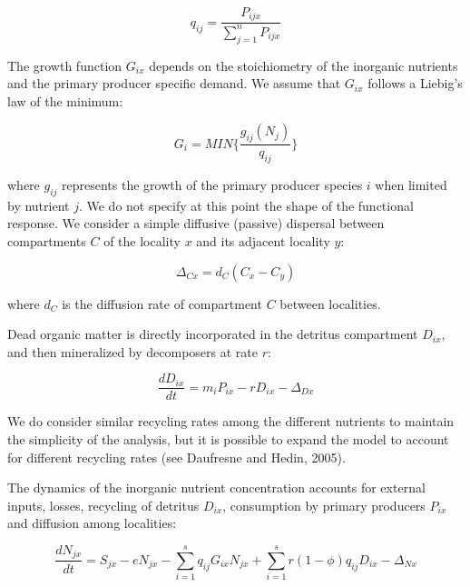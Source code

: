 \documentclass[letterpaper,twocolumn,showkeys]{revtex4-1}
\begin{document}
\begin{equation}
	\label{e:bnet}
	q_{ij}=\frac{P_{ijx}}{\sum_{j=1}^{n}P_{ijx}}
\end{equation}

The growth function $G_{ix}$ depends on the stoichiometry of the inorganic nutrients and the primary producer specific demand. We assume that $G_{ix}$ follows a Liebig’s law of the minimum:

\begin{equation}
	\label{e:bnet}
	G_{i}=MIN\{\frac{g_{ij}(N_{j})}{q_{ij}}\}
\end{equation}

where $g_{ij}$ represents the growth of the primary producer species $i$ when limited by nutrient $j$. We do not specify at this point the shape of the functional response. We consider a simple diffusive (passive) dispersal between compartments $C$ of the locality $x$ and its adjacent locality $y$: 

\begin{equation}
	\label{e:bnet}
	\Delta_{Cx}=d_{C}(C_{x}-C_{y})
\end{equation}

where $d_{C}$ is the diffusion rate of compartment $C$ between localities.  

Dead organic matter is directly incorporated in the detritus compartment $D_{ix}$, and then mineralized by decomposers at rate $r$:

\begin{equation}
	\label{e:bnet}
	\frac{dD_{ix}}{dt}=m_{i}P_{ix}-rD_{ix}-\Delta_{Dx}
\end{equation}

We do consider similar recycling rates among the different nutrients to maintain the simplicity of the analysis, but it is possible to expand the model to account for different recycling rates (see Daufresne and Hedin, 2005). 

The dynamics of the inorganic nutrient concentration accounts for external inputs, losses, recycling of detritus $D_{ix}$, consumption by primary producers $P_{ix}$ and diffusion among localities: 

\begin{equation}
	\label{e:bnet}
	\frac{dN_{jx}}{dt}=S_{jx}-eN_{jx}-\sum_{i=1}^{s}q_{ij}G_{ix}N_{jx}+\sum_{i=1}^{s}r(1-\phi)q_{ij}D_{ix}-\Delta_{Nx}
\end{equation}
\end{document}
